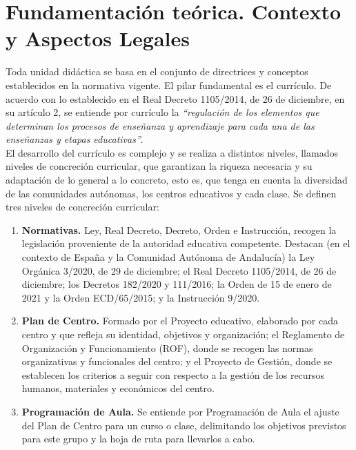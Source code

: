 \documentclass[../main.tex]{book}
\begin{document}
\chapter{Fundamentación teórica. Contexto y Aspectos Legales}
\label{sec:fund-teorica}

Toda unidad didáctica se basa en el conjunto de directrices y conceptos establecidos en la normativa vigente. El pilar fundamental es el currículo. De acuerdo con lo establecido en el Real Decreto 1105/2014, de 26 de diciembre, en su artículo 2, se entiende por currículo la \textit{``regulación de los elementos que determinan los procesos de enseñanza y aprendizaje para cada una de las enseñanzas y etapas educativas''}. \\

El desarrollo del currículo es complejo y se realiza a distintos niveles, llamados niveles de concreción curricular, que garantizan la riqueza necesaria y su adaptación de lo general a lo concreto, esto es, que tenga  en cuenta la diversidad  de las comunidades autónomas, los centros educativos y cada clase. Se definen tres niveles de concreción curricular:

\begin{enumerate}
	\item \textbf{Normativas.} Ley, Real Decreto, Decreto, Orden e Instrucción, recogen la legislación proveniente de la autoridad educativa competente. Destacan (en el contexto de España y la Comunidad Autónoma de Andalucía) la Ley Orgánica 3/2020, de 29 de diciembre; el Real Decreto 1105/2014, de 26 de diciembre; los Decretos 182/2020 y 111/2016; la Orden de 15 de enero de 2021 y la Orden ECD/65/2015; y la Instrucción 9/2020.
	
	\item \textbf{Plan de Centro.} Formado por el Proyecto educativo, elaborado por cada centro y que refleja su identidad, objetivos y organización; el Reglamento de Organización y Funcionamiento (ROF), donde se recogen las normas organizativas y funcionales del centro; y el Proyecto de Gestión, donde se establecen los criterios a seguir con respecto a la gestión de los recursos humanos, materiales y económicos del centro.
	
	\item \textbf{Programación de Aula.} Se entiende por Programación de Aula el ajuste del Plan de Centro para un curso o clase, delimitando los objetivos previstos para este grupo y la hoja de ruta para llevarlos a cabo.
\end{enumerate}
\end{document}
